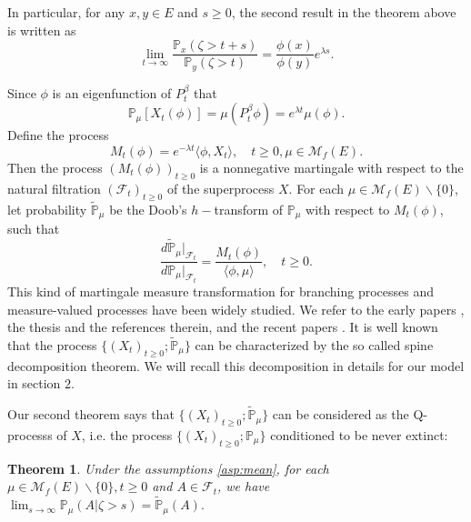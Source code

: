 \documentclass[12pt,a4paper]{amsart}
\numberwithin{equation}{section}
\theoremstyle{plain}
\newtheorem{thm}{Theorem}[section]
\theoremstyle{definition}
\theoremstyle{remark}
\begin{document}
{\color{gray}
In particular, for any $x,y\in E$ and $s\geq 0$, the second result in the theorem above is written as
\begin{equation}\label{ratioresult}
 	\lim_{t\rightarrow\infty}\frac{\mathbb P_x(\zeta>t+s)}{\mathbb P_y(\zeta>t)}=\frac{\phi(x)}{\phi(y)}e^{\lambda s}.
\end{equation}


Since $\phi$ is an eigenfunction of $P_t^\beta$ that
\begin{equation}
	\mathbb P_\mu[X_t(\phi)]= \mu(P_t^\beta \phi)=e^{\lambda t}\mu(\phi).
\end{equation}
Define the process
\[
	M_t(\phi)=e^{-\lambda t}  \langle \phi, X_t\rangle, \quad t\geq 0, \mu\in\mathcal M_f(E).
\]
Then the process  $(M_t(\phi))_{t\geq 0}$ is a nonnegative martingale with respect to the natural filtration $(\mathscr F_t)_{t\geq 0}$ of the superprocess $X$.
For each $\mu \in \mathcal M_f(E)\backslash\{0\}$, let probability $\widetilde{\mathbb P}_\mu$ be the Doob's $h-$transform of $\mathbb P_\mu$ with respect to $M_t(\phi)$, such that
\begin{equation} \label{eq: martingale transformation}
	\frac{d\widetilde{\mathbb P}_\mu|_{\mathscr F_t}}{d\mathbb P_\mu|_{\mathscr F_t}}
	=\frac{M_t(\phi)}{\langle\phi,\mu\rangle },
	\quad t\geq 0.
\end{equation}
	This kind of martingale measure transformation for branching processes and measure-valued processes have been widely studied.
	We refer to the early papers \cite{EnglanderKyprianou2004Local,Evans1993Two,RoellyRouault1989Processus}, the thesis \cite{Penisson2010Conditional} and the references therein, and the recent papers \cite{ChampagnatRoelly2008Limit,RenSongSun2017Spine,RenSongZhang2018Williams}.
	It is well known that the process $\{(X_t)_{t\geq 0}; \widetilde{\mathbb P}_{\mu}\}$ can be characterized by the so called spine decomposition theorem.
	We will recall this decomposition in details for our model in section $2$.


Our second theorem says that $\{(X_t)_{t\geq 0}; \widetilde{\mathbb P}_{\mu}\}$ can be considered as the Q-processs of $X$, i.e. the process $\{(X_t)_{t\geq 0}; \mathbb P_{\mu}\}$ conditioned to be never extinct:

\begin{thm}\label{thm: Qprocess}
	Under the assumptions \ref{asp:mean}, for each $\mu \in \mathcal M_f(E)\backslash\{0\}, t\geq 0$ and $A\in\mathscr F_t$, we have
$
	\lim_{s\rightarrow\infty}\mathbb P_\mu(A |\zeta>s)=\widetilde{\mathbb P}_\mu(A).
$
\end{thm}

}
\end{document}
